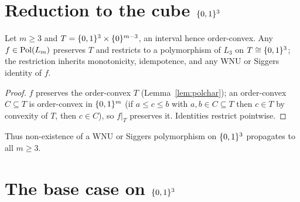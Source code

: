 \section{Reduction to the cube $\{0,1\}^3$}

\begin{lem}\label{lem:restrict}
  Let $m\ge3$ and $T=\{0,1\}^3\times\{0\}^{m-3}$, an interval hence
  order-convex.  Any $f\in\operatorname{Pol}(L_m)$ preserves $T$ and restricts to a
  polymorphism of $L_3$ on $T\cong\{0,1\}^3$; the restriction inherits
  monotonicity, idempotence, and any WNU or Siggers identity of $f$.
\end{lem}
\begin{proof}
  $f$ preserves the order-convex $T$ (Lemma~\ref{lem:polchar}); an
  order-convex $C\subseteq T$ is order-convex in $\{0,1\}^m$ (if $a\le c\le
  b$ with $a,b\in C\subseteq T$ then $c\in T$ by convexity of $T$, then
  $c\in C$), so $f|_T$ preserves it.  Identities restrict pointwise.
\end{proof}

Thus non-existence of a WNU or Siggers polymorphism on $\{0,1\}^3$ propagates
to all $m\ge3$.

\section{The base case on $\{0,1\}^3$}


